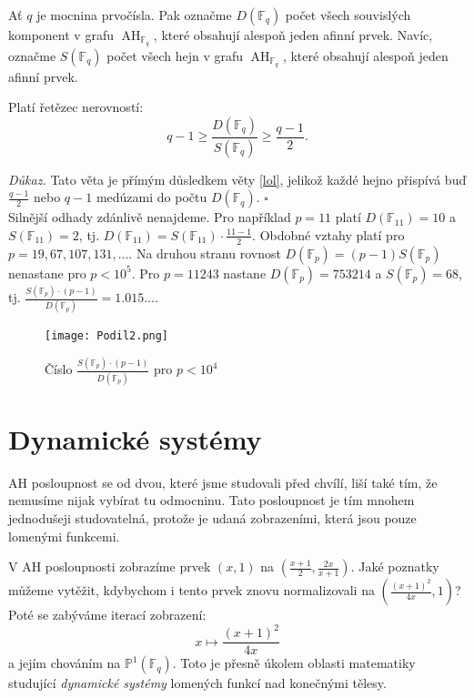 \documentclass[12pt]{report}
\DeclareMathOperator{\AH}{AH}
\begin{document}
\begin{definice}
Ať $q$ je mocnina prvočísla. Pak označme $D(\mathbb{F}_q)$ počet všech souvislých komponent v grafu $\AH_{\mathbb{F}_q}$, které obsahují alespoň jeden afinní prvek. Navíc, označme $S(\mathbb{F}_q)$ počet všech hejn v grafu $\AH_{\mathbb{F}_q}$, které obsahují alespoň jeden afinní prvek.
\end{definice}


\begin{veta}\label{po}
Platí řetězec nerovností:
$$q-1 \geqslant \frac{D(\mathbb{F}_q)}{S(\mathbb{F}_q)} \geqslant \frac{q-1}{2}.$$
\end{veta}
\noindent \textit{Důkaz.} Tato věta je přímým důsledkem věty \ref{lol}, jelikož každé hejno přispívá buď $\frac{q-1}{2}$ nebo $q-1$ medúzami do počtu $D(\mathbb{F}_q)$. \hfill $\square$\\

Silnější odhady zdánlivě nenajdeme. Pro například $p = 11$ platí $D(\mathbb{F}_{11}) = 10$ a $S(\mathbb{F}_{11}) = 2$, tj. $D(\mathbb{F}_{11}) = S(\mathbb{F}_{11}) \cdot \frac{11-1}{2}$. Obdobné vztahy platí pro $p = 19, 67,107,131,\dots$. Na druhou stranu rovnost $D(\mathbb{F}_p) = (p-1) S(\mathbb{F}_p)$ nenastane pro $p<10^5$. Pro $p =11243$ nastane $D(\mathbb{F}_p) = 753214$ a $S(\mathbb{F}_p) = 68$, tj. $\frac{S(\mathbb{F}_p) \cdot (p-1)}{D(\mathbb{F}_p)} = 1.015\dots$. 
\begin{figure}[h]
\centering
  \texttt{[image: Podil2.png]}
  \label{fig:boat1}
  \caption{Číslo $\frac{S(\mathbb{F}_p) \cdot (p-1)}{D(\mathbb{F}_p)}$ pro $p < 10^4$}
\end{figure}


\section{Dynamické systémy}

AH posloupnost se od dvou, které jsme studovali před chvílí, liší také tím, že nemusíme nijak vybírat tu  odmocninu. Tato posloupnost je tím mnohem jednodušeji studovatelná, protože je udaná zobrazeními, která jsou pouze lomenými funkcemi. 
  
V AH posloupnosti zobrazíme prvek $(x,1)$ na $\left(\frac{x+1}{2}, \frac{2x}{x+1}\right)$. Jaké poznatky můžeme vytěžit, kdybychom i tento prvek znovu normalizovali na $\left ( \frac{(x+1)^2}{4x}, 1 \right)$? Poté se zabýváme iterací zobrazení:
$$x \longmapsto \frac{(x+1)^2}{4x}$$
a jejím chováním na $\mathbb{P}^1 ( \mathbb{F}_q)$. Toto je přesně úkolem oblasti matematiky studující \textit{dynamické systémy} lomených funkcí nad konečnými tělesy.
\end{document}
